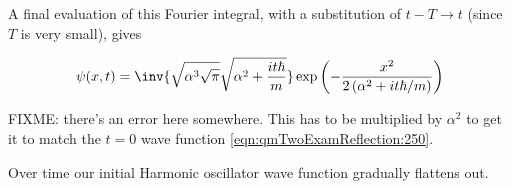 A final evaluation of this Fourier integral, with a substitution of $t - T \rightarrow t$ (since $T$ is very small), gives

\begin{equation}\label{eqn:qmTwoExamReflection:310}
\psi(x, t) = 
\inv{ \sqrt{\alpha^3 \sqrt{\pi}} \sqrt{\alpha^2 + \frac{i t \hbar}{m}}}
\exp\left(
-\frac{x^2}{2 \left(\alpha^2 + i t \hbar/m\right)}
\right)
\end{equation}

FIXME: there's an error here somewhere.  This has to be multiplied by $\alpha^2$ to get it to match the $t=0$ wave function \ref{eqn:qmTwoExamReflection:250}.

Over time our initial Harmonic oscillator wave function gradually flattens out.


\EndArticle
